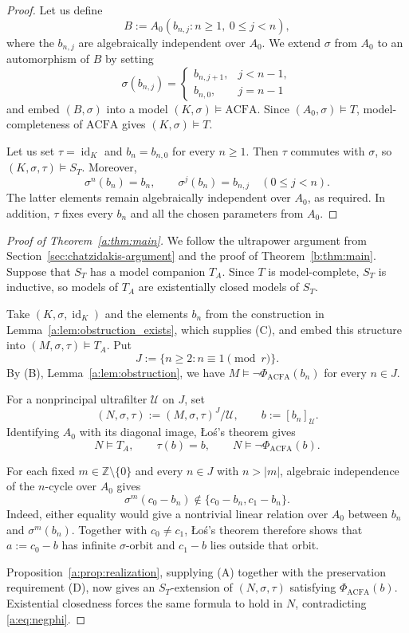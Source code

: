 \documentclass[11pt,a4paper]{amsart}
\renewcommand{\geq}{\geqslant}
\renewcommand{\leq}{\leqslant}
\renewcommand{\ge}{\geqslant}
\theoremstyle{definition}
\newcommand{\Z}{\mathbb Z}
\DeclareMathOperator{\id}{id}
\newcommand{\ACFA}{\mathrm{ACFA}}
\begin{document}
\begin{proof}
Let us define
\[
B:=A_0(b_{n,j}:n\geq1,\ 0\leq j<n),
\]
where the $b_{n,j}$ are algebraically independent over $A_0$.  
We extend $\sigma$ from $A_0$ to an automorphism of $B$ by setting
\[
\sigma(b_{n,j})=
\begin{cases}
b_{n,j+1},&j<n-1,\\
b_{n,0},&j=n-1
\end{cases}
\]
and embed $(B,\sigma)$ into a model $(K,\sigma)\models\ACFA$.
Since $(A_0,\sigma)\models T$, model-completeness of $\ACFA$
gives $(K,\sigma)\models T$.

Let us set $\tau=\id_K$ and $b_n=b_{n,0}$ for every $n\geq1$.
Then $\tau$ commutes with $\sigma$, so
$(K,\sigma,\tau)\models S_T$.
Moreover,
\[
\sigma^n(b_n)=b_n,
\qquad
\sigma^j(b_n)=b_{n,j}\quad(0\leq j<n).
\]
The latter elements remain algebraically independent over $A_0$,
as required. In addition, $\tau$ fixes every $b_n$ and all the chosen parameters
from $A_0$.
\end{proof}
\begin{proof}[Proof of Theorem~\ref{a:thm:main}]
We follow the ultrapower argument from
Section~\ref{sec:chatzidakis-argument} and the proof of
Theorem~\ref{b:thm:main}.
Suppose that $S_T$ has a model companion $T_A$.
Since $T$ is model-complete, $S_T$ is inductive, so models
of $T_A$ are existentially closed models of $S_T$.

Take $(K,\sigma,\id_K)$ and the elements $b_n$ from the
construction in Lemma~\ref{a:lem:obstruction_exists},
which supplies (C), and embed this structure into
$(M,\sigma,\tau)\models T_A$.
Put
\[
J:=\{n\ge2:n\equiv1\pmod r\}.
\]
By (B), Lemma~\ref{a:lem:obstruction}, we have
$M\models\neg\Phi_{\mathrm{ACFA}}(b_n)$ for every $n\in J$.

For a nonprincipal ultrafilter $\mathcal U$ on $J$, set
\[
(N,\sigma,\tau):=(M,\sigma,\tau)^J/\mathcal U,
\qquad b:=[b_n]_{\mathcal U}.
\]
Identifying $A_0$ with its diagonal image, \L o\'s's theorem gives
\begin{equation}\label{a:eq:negphi}
N\models T_A,\qquad \tau(b)=b,\qquad
N\models\neg\Phi_{\mathrm{ACFA}}(b).
\end{equation}

For each fixed $m\in\Z\setminus\{0\}$ and every $n\in J$
with $n>|m|$, algebraic independence of the $n$-cycle
over $A_0$ gives
\[
\sigma^m(c_0-b_n)\notin\{c_0-b_n,c_1-b_n\}.
\]
Indeed, either equality would give a nontrivial linear
relation over $A_0$ between $b_n$ and $\sigma^m(b_n)$.
Together with $c_0\ne c_1$, \L o\'s's theorem therefore
shows that $a:=c_0-b$ has infinite $\sigma$-orbit and
$c_1-b$ lies outside that orbit.

Proposition~\ref{a:prop:realization}, supplying (A) together
with the preservation requirement (D), now gives an
$S_T$-extension of $(N,\sigma,\tau)$ satisfying
$\Phi_{\mathrm{ACFA}}(b)$.
Existential closedness forces the same formula to hold
in $N$, contradicting \eqref{a:eq:negphi}.
\end{proof}
\end{document}
